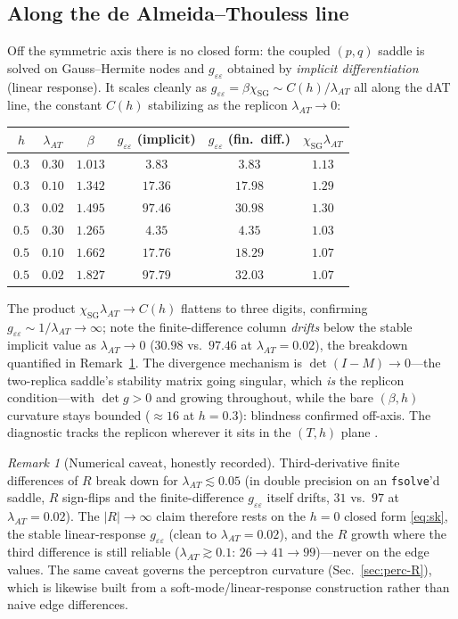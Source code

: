 \documentclass[a4paper,11pt]{article}
\theoremstyle{plain}
\theoremstyle{definition}
\theoremstyle{remark}
\newtheorem{remark}{Remark}
\newcommand{\Ric}{R}
\newcommand{\eps}{\varepsilon}
\newcommand{\detg}{\det g}
\begin{document}
\subsection{Along the de Almeida--Thouless line}\label{sec:sk-dat}
Off the symmetric axis there is no closed form: the coupled $(p,q)$ saddle is solved on Gauss--Hermite nodes
and $g_{\eps\eps}$ obtained by \emph{implicit differentiation} (linear response). It scales cleanly as
$g_{\eps\eps}=\beta\chi_{\mathrm{SG}}\sim C(h)/\lambda_{AT}$ all along the dAT line, the constant $C(h)$
stabilizing as the replicon $\lambda_{AT}\to0$:

\begin{center}
\begin{tabular}{@{}cccccc@{}}
\toprule
$h$ & $\lambda_{AT}$ & $\beta$ & $g_{\eps\eps}$ (implicit) & $g_{\eps\eps}$ (fin.\ diff.) & $\chi_{\mathrm{SG}}\lambda_{AT}$\\
\midrule
$0.3$ & $0.30$ & $1.013$ & $3.83$ & $3.83$ & $1.13$\\
$0.3$ & $0.10$ & $1.342$ & $17.36$ & $17.98$ & $1.29$\\
$0.3$ & $0.02$ & $1.495$ & $97.46$ & $30.98$ & $1.30$\\
$0.5$ & $0.30$ & $1.265$ & $4.35$ & $4.35$ & $1.03$\\
$0.5$ & $0.10$ & $1.662$ & $17.76$ & $18.29$ & $1.07$\\
$0.5$ & $0.02$ & $1.827$ & $97.79$ & $32.03$ & $1.07$\\
\bottomrule
\end{tabular}
\end{center}

The product $\chi_{\mathrm{SG}}\lambda_{AT}\to C(h)$ flattens to three digits, confirming
$g_{\eps\eps}\sim1/\lambda_{AT}\to\infty$; note the finite-difference column \emph{drifts} below the stable
implicit value as $\lambda_{AT}\to0$ ($30.98$ vs.\ $97.46$ at $\lambda_{AT}=0.02$), the breakdown quantified
in Remark~\ref{rem:fd}. The divergence mechanism is $\det(I-M)\to0$---the two-replica saddle's stability
matrix going singular, which \emph{is} the replicon condition---with $\detg>0$ and growing throughout, while
the bare $(\beta,h)$ curvature stays bounded ($\approx16$ at $h=0.3$): blindness confirmed off-axis. The
diagnostic tracks the replicon wherever it sits in the $(T,h)$ plane
\cite[receipt \texttt{module\_L\_SK\_converse.py}]{repo}.

\begin{remark}[Numerical caveat, honestly recorded]\label{rem:fd}
Third-derivative finite differences of $\Ric$ break down for $\lambda_{AT}\lesssim0.05$ (in double precision
on an \texttt{fsolve}'d saddle, $\Ric$ sign-flips and the finite-difference $g_{\eps\eps}$ itself drifts,
$31$ vs.\ $97$ at $\lambda_{AT}=0.02$). The $|\Ric|\to\infty$ claim therefore rests on the $h=0$ closed
form \eqref{eq:sk}, the stable linear-response $g_{\eps\eps}$ (clean to $\lambda_{AT}=0.02$), and the $\Ric$
growth where the third difference is still reliable ($\lambda_{AT}\gtrsim0.1$: $26\to41\to99$)---never on the
edge values. The same caveat governs the perceptron curvature (Sec.~\ref{sec:perc-R}), which is likewise
built from a soft-mode/linear-response construction rather than naive edge differences.
\end{remark}
\end{document}
